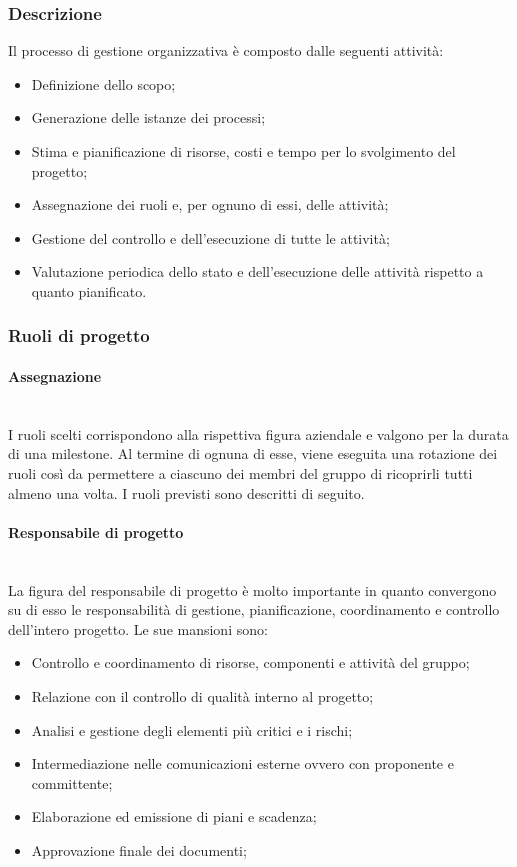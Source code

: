 		\subsubsection{Descrizione}
			Il processo di gestione organizzativa è composto dalle seguenti attività:
			\begin{itemize}
				\item Definizione dello scopo;
				\item Generazione delle istanze dei processi;
				\item Stima e pianificazione di risorse, costi e tempo per lo svolgimento del progetto;
				\item Assegnazione dei ruoli e, per ognuno di essi, delle attività;
				\item Gestione del controllo e dell'esecuzione di tutte le attività;
				\item Valutazione periodica dello stato e dell'esecuzione delle attività rispetto a quanto pianificato.
			\end{itemize}
		\subsubsection{Ruoli di progetto}
			\paragraph{Assegnazione}\mbox{}\\ [1mm]
				I ruoli scelti corrispondono alla rispettiva figura aziendale e valgono per la durata di una milestone. Al termine di ognuna di esse, viene eseguita una rotazione dei ruoli così da permettere a ciascuno dei membri del gruppo di ricoprirli tutti almeno una volta.
				I ruoli previsti sono descritti di seguito.
			\paragraph{Responsabile di progetto}\mbox{}\\ [1mm]
				La figura del responsabile di progetto è molto importante in quanto convergono su di esso le responsabilità di gestione, pianificazione, coordinamento e controllo dell'intero progetto.
				Le sue mansioni sono:
				\begin{itemize}
					\item Controllo e coordinamento di risorse, componenti e attività del gruppo;
					\item Relazione con il controllo di qualità interno al progetto;
					\item Analisi e gestione degli elementi più critici e i rischi;
					\item Intermediazione nelle comunicazioni esterne ovvero con proponente e committente;
					\item Elaborazione ed emissione di piani e scadenza;
					\item Approvazione finale dei documenti;
				\end{itemize}
